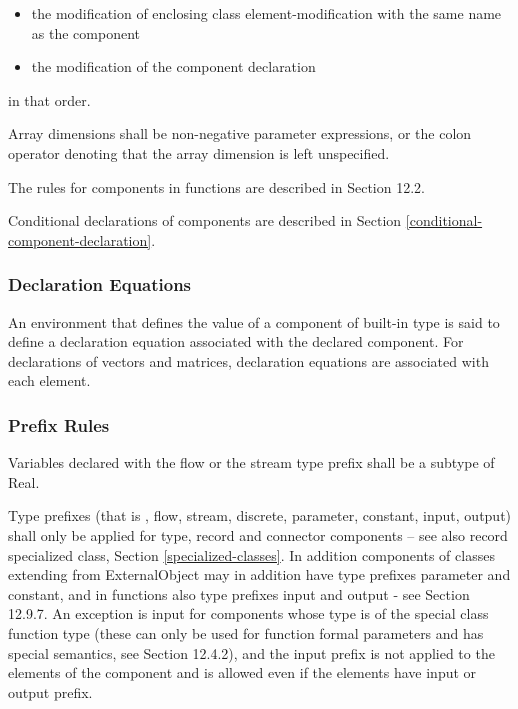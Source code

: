 \documentclass[10pt,a4paper]{report}
\def\doublelabel#1{\label{#1}\hypertarget{#1}{}}
\begin{document}
\begin{itemize}
\item
  the modification of enclosing class element-modification with the same
  name as the component
\end{itemize}

\begin{itemize}
\item
  the modification of the component declaration
\end{itemize}

in that order.

Array dimensions shall be non-negative parameter expressions, or the
colon operator denoting that the array dimension is left unspecified.

The rules for components in functions are described in Section 12.2.

Conditional declarations of components are described in Section \ref{conditional-component-declaration}.

\subsubsection{Declaration Equations}\doublelabel{declaration-equations}

An environment that defines the value of a component of built-in type is
said to define a declaration equation associated with the declared
component. For declarations of vectors and matrices, declaration
equations are associated with each element.

\subsubsection{Prefix Rules}\doublelabel{prefix-rules}

Variables declared with the flow or the stream type prefix shall be a
subtype of Real.

Type prefixes (that is , flow, stream, discrete, parameter, constant,
input, output) shall only be applied for type, record and connector
components -- see also record specialized class, Section \ref{specialized-classes}. In
addition components of classes extending from ExternalObject may in
addition have type prefixes parameter and constant, and in functions
also type prefixes input and output - see Section 12.9.7. An exception
is input for components whose type is of the special class function type
(these can only be used for function formal parameters and has special
semantics, see Section 12.4.2), and the input prefix is not applied to
the elements of the component and is allowed even if the elements have
input or output prefix.
\end{document}
